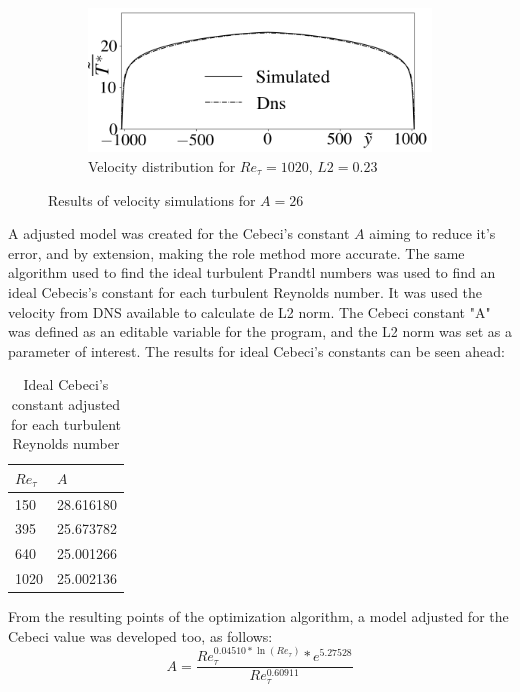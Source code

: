 \documentclass[10pt]{article} %
\begin{document}
\begin{figure}[!h]
\begin{subfigure}[t]{0.5\textwidth}
	\end{subfigure}
	\begin{subfigure}[t]{0.45\textwidth}
		\centering
		\includegraphics[angle=0, scale=0.24]{fotos_formatacao_final/Temperature_1000_Avelocity}
		\caption{Velocity distribution for $Re_\tau = 1020$, $L2 = 0.23$}
	\end{subfigure}	
	\caption{Results of velocity simulations for $A = 26$}
\end{figure}


A adjusted model was created for the Cebeci's constant $A$ aiming to reduce it's error, and by extension, making the role method more accurate. The same algorithm used to find the ideal turbulent Prandtl numbers was used to find an ideal Cebecis's constant for each turbulent Reynolds number. It was used the velocity from DNS available to calculate de L2 norm. The Cebeci constant "A" was defined as an editable variable for the program, and the L2 norm was set as a parameter of interest. The results for ideal Cebeci's constants can be seen ahead:

\newpage

\begin{table}[!h]
	\centering
	\caption{Ideal Cebeci's constant adjusted for each turbulent Reynolds number}
	\begin{tabular}{ll}
		\hline
		$Re_\tau$ & $A$\\
		\hline
		150  &   28.616180\\
		395  &   25.673782\\
		640  &   25.001266\\
		1020 &  25.002136\\ 
		\hline
	\end{tabular}
\end{table}

 From the resulting points of the optimization algorithm, a model adjusted for the Cebeci value was developed too, as follows:
\begin{equation}
A = \frac{Re_\tau ^{0.04510 * \ln(Re_\tau)} *e ^ {5.27528} }{Re_\tau ^{0.60911}}
\end{equation}
\end{document}
